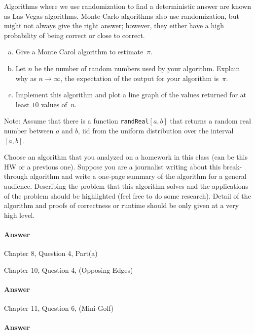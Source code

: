 \documentclass{article}
\begin{document}



\collab{\todo{}}
\nextprob{}

Algorithms where we use randomization to find a deterministic answer are known
as Las Vegas algorithms.  Monte Carlo algorithms also use randomization, but
might not always give the right answer; however, they either have a high
probability of being correct or close to correct.

\begin{enumerate}[(a)]
    \item Give a Monte Carol algorithm to estimate~$\pi$.
    \item Let $n$ be the number of random numbers used by your algorithm.
        Explain why as $n \to \infty$, the expectation of the output for your
        algorithm is~$\pi$.
    \item Implement this algorithm and plot a line graph of
        the values returned for at least $10$ values of~$n$.
\end{enumerate}

Note: Assume that there is a function \texttt{randReal}$[a,b]$ that returns a random
real number between $a$ and $b$, iid from the uniform distribution over the
interval $[a,b]$.



\collab{\todo{}}
\nextprob{}

Choose an algorithm that you analyzed on a homework in this class (can be this
HW or a previous one).  Suppose you are a journalist writing about this
break-through algorithm and write a one-page summary of the algorithm for a
general audience.  Describing the problem that this algorithm solves and the
applications of the problem should be highlighted (feel free to do some
research).  Detail of the algorithm and proofs of correctness or runtime should
be only given at a very high level.

\paragraph{Answer}



\collab{\todo{}}

Chapter 8, Question 4, Part(a)


\collab{\todo{}}
\nextprob{}

Chapter 10, Question 4, (Opposing Edges)

\paragraph{Answer}

\collab{\todo{}}
\nextprob{}

Chapter 11, Question 6, (Mini-Golf)

\paragraph{Answer}
\end{document}

